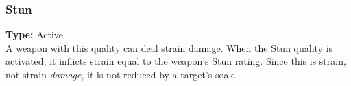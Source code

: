 \subsubsection{Stun}
\label{iqty:stundamage}
\textbf{Type:} Active\\
A weapon with this quality can deal strain damage.
When the Stun quality is activated, it inflicts strain
equal to the weapon's Stun rating. Since this is
strain, not strain \textit{damage}, it is not reduced
by a target’s soak.
